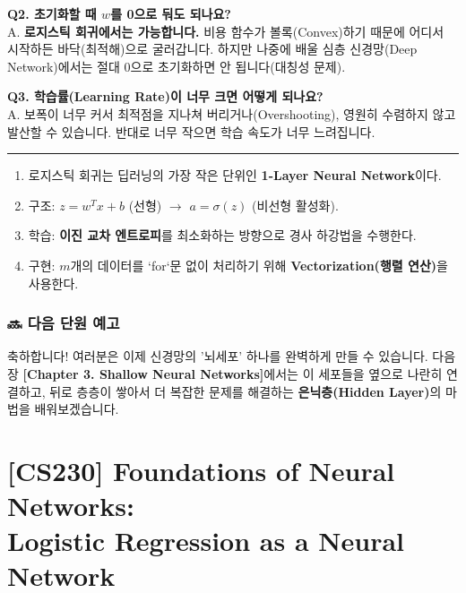 \documentclass[11pt,a4paper]{book}
\theoremstyle{definition}
\begin{document}
\textbf{Q2. 초기화할 때 $w$를 0으로 둬도 되나요?} \\
A. \textbf{로지스틱 회귀에서는 가능합니다.} 비용 함수가 볼록(Convex)하기 때문에 어디서 시작하든 바닥(최적해)으로 굴러갑니다. 하지만 나중에 배울 심층 신경망(Deep Network)에서는 절대 0으로 초기화하면 안 됩니다(대칭성 문제).

\textbf{Q3. 학습률(Learning Rate)이 너무 크면 어떻게 되나요?} \\
A. 보폭이 너무 커서 최적점을 지나쳐 버리거나(Overshooting), 영원히 수렴하지 않고 발산할 수 있습니다. 반대로 너무 작으면 학습 속도가 너무 느려집니다.

\vspace{1cm}
\hrule
\vspace{0.5cm}

\begin{summarybox}[title={📝 단원 요약 (Chapter Summary)}]
\begin{enumerate}
    \item 로지스틱 회귀는 딥러닝의 가장 작은 단위인 \textbf{1-Layer Neural Network}이다.
    \item 구조: $z = w^Tx + b$ (선형) $\rightarrow$ $a = \sigma(z)$ (비선형 활성화).
    \item 학습: \textbf{이진 교차 엔트로피}를 최소화하는 방향으로 경사 하강법을 수행한다.
    \item 구현: $m$개의 데이터를 `for`문 없이 처리하기 위해 \textbf{Vectorization(행렬 연산)}을 사용한다.
\end{enumerate}
\end{summarybox}

\subsection*{🔜 다음 단원 예고}
축하합니다! 여러분은 이제 신경망의 '뇌세포' 하나를 완벽하게 만들 수 있습니다. 다음 장 \textbf{[Chapter 3. Shallow Neural Networks]}에서는 이 세포들을 옆으로 나란히 연결하고, 뒤로 층층이 쌓아서 더 복잡한 문제를 해결하는 \textbf{은닉층(Hidden Layer)}의 마법을 배워보겠습니다.


\chapter{[CS230] Foundations of Neural Networks: \\ Logistic Regression as a Neural Network}
\label{ch:lecture2}
\end{document}
